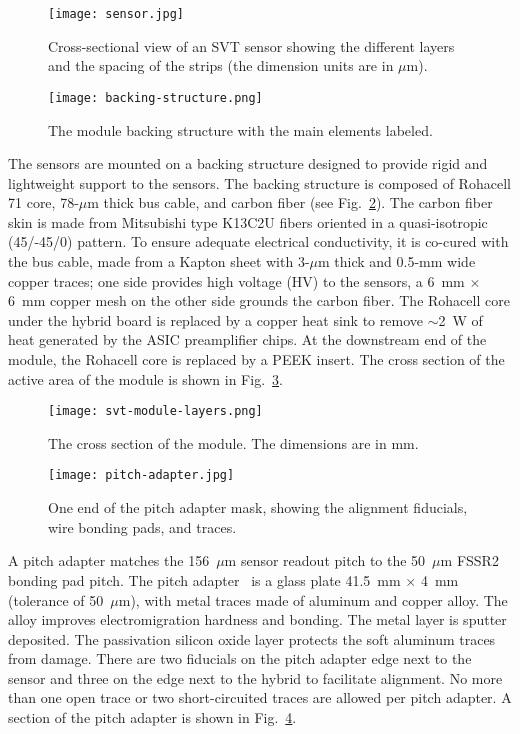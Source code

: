 \begin{figure}[h] 
\centering 
\texttt{[image: sensor.jpg]}
\caption{Cross-sectional view of an SVT sensor showing the different layers and the spacing of the strips (the
  dimension units are in $\mu$m).}
\label{fig:sensor}
\end{figure}

\begin{figure}[h] 
\centering 
\texttt{[image: backing-structure.png]}
\caption{The module backing structure with the main elements labeled.}
\label{fig:backing-structure}
\end{figure}

The sensors are mounted on a backing structure designed to provide rigid and lightweight support to the sensors.
The backing structure is composed of Rohacell 71 core, 78-$\mu$m thick bus cable, and carbon fiber (see
Fig.~\ref{fig:backing-structure}). The carbon fiber skin is made from Mitsubishi type K13C2U fibers oriented in
a quasi-isotropic (45/-45/0) pattern. To ensure adequate electrical conductivity, it is co-cured with the bus cable,
made from a Kapton sheet with 3-$\mu$m thick and 0.5-mm wide copper traces; one side provides high voltage
(HV) to the sensors, a 6~mm $\times$ 6~mm copper mesh on the other side grounds the carbon fiber. The Rohacell
core under the hybrid board is replaced by a copper heat sink to remove $\sim$2~W of heat generated by the
ASIC preamplifier chips. At the downstream end of the module, the Rohacell core is replaced by a PEEK insert. The
cross section of the active area of the module is shown in Fig.~\ref{fig:svt-module-layers}. 

\begin{figure}[h] 
\centering 
\texttt{[image: svt-module-layers.png]}
\caption{The cross section of the module. The dimensions are in mm.}
\label{fig:svt-module-layers}
\end{figure}

\begin{figure}[hbt] 
\centering 
\texttt{[image: pitch-adapter.jpg]}
\caption{One end of the pitch adapter mask, showing the alignment fiducials, wire bonding pads, and traces.}
\label{fig:pitch-adapter}
\end{figure}

A pitch adapter matches the 156~$\mu$m sensor readout pitch to the 50~$\mu$m FSSR2 bonding pad pitch. The
pitch adapter~\cite{PA} is a glass plate 41.5~mm $\times$ 4~mm (tolerance of 50~$\mu$m), with metal traces made
of aluminum and copper alloy. The alloy improves electromigration hardness and bonding. The metal layer is sputter
deposited. The passivation silicon oxide layer protects the soft aluminum traces from damage. There are two fiducials
on the pitch adapter edge next to the sensor and three on the edge next to the hybrid to facilitate alignment. No
more than one open trace or two short-circuited traces are allowed per pitch adapter. A section of the pitch adapter
is shown in Fig.~\ref{fig:pitch-adapter}. 

